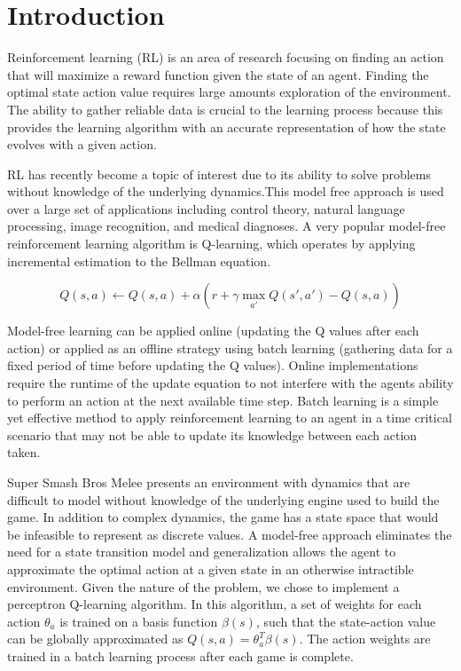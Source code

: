 
\section{Introduction}

Reinforcement learning (RL) is an area of research focusing on finding an action that will maximize a reward function given the state of an agent. Finding the optimal state action value requires large amounts exploration of the environment. The ability to gather reliable data is crucial to the learning process because this provides the learning algorithm with an accurate representation of how the state evolves with a given action. 

RL has recently become a topic of interest due to its ability to solve problems without knowledge of the underlying dynamics.This model free approach is used over a large set of applications including control theory, natural language processing, image recognition, and medical diagnoses. A very popular model-free reinforcement learning algorithm is Q-learning, which operates by applying incremental estimation to the Bellman equation.

\begin{equation}
	Q(s,a) \leftarrow Q(s,a)+\alpha(r + \gamma \max_{a'} Q(s',a') - Q(s,a))
\end{equation}

Model-free learning can be applied online (updating the Q values after each action) or applied as an offline strategy using batch learning (gathering data for a fixed period of time before updating the Q values). Online implementations require the runtime of the update equation to not interfere with the agents ability to perform an action at the next available time step. Batch learning is a simple yet effective method to apply reinforcement learning to an agent in a time critical scenario that may not be able to update its knowledge between each action taken.

Super Smash Bros Melee presents an environment with dynamics that are difficult to model without knowledge of the underlying engine used to build the game. In addition to complex dynamics, the game has a state space that would be infeasible to represent as discrete values. A model-free approach eliminates the need for a state transition model and generalization allows the agent to approximate the optimal action at a given state in an otherwise intractible environment. Given the nature of the problem, we chose to implement a perceptron Q-learning algorithm. In this algorithm, a set of weights for each action $\theta_a$ is trained on a basis function $\beta(s)$, such that the state-action value can be globally approximated as $Q(s,a) = \theta^T_a\beta(s)$. The action weights are trained in a batch learning process after each game is complete.

